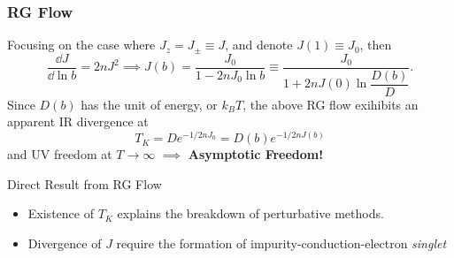 \documentclass[10pt,aspectratio=43,xcolor=x11names]{beamer}%
\begin{document}
		\begin{frame}\frametitle{RG Flow}
			Focusing on the case where $J_z=J_\pm\equiv J$, and denote $J(1)\equiv J_0$, then
			\begin{equation*}
				\dfrac{\dd J}{\dd\ln b}=2nJ^2\implies J(b)=\dfrac{J_0}{1-2nJ_0\ln b}\equiv\dfrac{J_0}{1+2n J(0)\ln\dfrac{D(b)}{D}}.
			\end{equation*}
			Since $D(b)$ has the unit of energy, or $k_BT$, the above RG flow exihibits an apparent {\color{blue}IR divergence} at
			\begin{equation*}
				T_K=D e^{-1/2nJ_0}=D(b)e^{-1/2nJ(b)}
			\end{equation*}
			and {\color{blue}UV freedom} at $T\rightarrow\infty$ \pause $\implies$ \textbf{\color{blue} Asymptotic Freedom!}
			\pause
			\begin{block}{Direct Result from RG Flow}
				\begin{itemize}
					\item Existence of $T_K$ explains the breakdown of perturbative methods.
					\item Divergence of $J$ require the formation of impurity-conduction-electron \emph{\color{blue} singlet}
				\end{itemize}
			\end{block}
		\end{frame}
		
\end{document}
